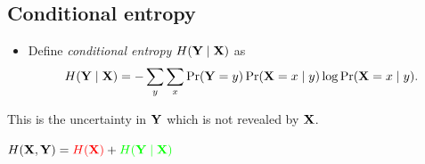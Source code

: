 \subsection{Conditional entropy}

\begin{frame}
  \begin{definition}
    \begin{itemize}
      \item Define \emph{conditional entropy} \(H(\mathbf Y\mid \mathbf X)\) 
        as
        \begin{align*}
          H(\stoch Y\mid \stoch X) = %
          -\sum_y\sum_x \Pr(\stoch Y = y)\Pr(\stoch X = x\mid y)\log \Pr(\stoch 
          X = x\mid y).
        \end{align*}
    \end{itemize}
  \end{definition}

  \pause{}

  \begin{remark}
    This is the uncertainty in \(\mathbf Y\) which is not revealed by \(\mathbf 
      X\).
  \end{remark}
\end{frame}

\begin{frame}
  \begin{theorem}
    \(H(\mathbf X, \mathbf Y) = {\color{red}H(\mathbf X)} + {\color{green}H(\mathbf 
        Y\mid \mathbf X)}\)
  \end{theorem}

  \begin{center}
  \end{center}
\end{frame}


